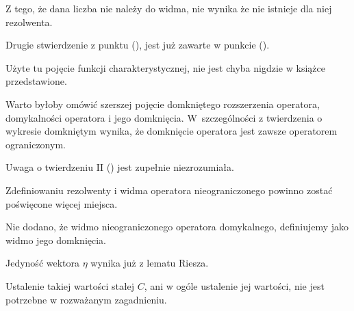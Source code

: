 \documentclass[a4paper,11pt]{article}
\begin{document}
 Z tego, że dana liczba nie należy do widma, nie wynika
że nie istnieje dla niej rezolwenta.

\vspace{\spaceFour}



 Drugie stwierdzenie z punktu (), jest już
  zawarte w punkcie ().

\vspace{\spaceFour}



 Użyte tu pojęcie funkcji charakterystycznej, nie jest
chyba nigdzie w książce przedstawione.

\vspace{\spaceFour}



 Warto byłoby omówić szerszej pojęcie domkniętego
rozszerzenia operatora, domykalności operatora i jego domknięcia. W~szczególności z twierdzenia o wykresie domkniętym wynika, że
domknięcie operatora jest zawsze operatorem ograniczonym.

\vspace{\spaceFour}



 Uwaga o twierdzeniu II () jest zupełnie
niezrozumiała.

\vspace{\spaceFour}



 Zdefiniowaniu rezolwenty i widma operatora
nieograniczonego powinno zostać poświęcone więcej miejsca.

\vspace{\spaceFour}



 Nie dodano, że widmo nieograniczonego operatora
domykalnego, definiujemy jako widmo jego domknięcia.

\vspace{\spaceFour}



 Jedyność wektora $\eta$ wynika już z lematu Riesza.

\vspace{\spaceFour}



 Ustalenie takiej wartości stałej $C$, ani w ogóle
ustalenie jej wartości, nie jest potrzebne w rozważanym zagadnieniu.

\vspace{\spaceFour}
\end{document}
